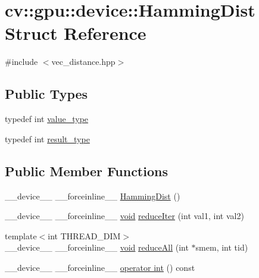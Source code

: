\hypertarget{structcv_1_1gpu_1_1device_1_1HammingDist}{\section{cv\-:\-:gpu\-:\-:device\-:\-:Hamming\-Dist Struct Reference}
\label{structcv_1_1gpu_1_1device_1_1HammingDist}
}


{\ttfamily \#include $<$vec\-\_\-distance.\-hpp$>$}

\subsection*{Public Types}
\begin{DoxyCompactItemize}
\item 
typedef int \hyperlink{structcv_1_1gpu_1_1device_1_1HammingDist_ad19a0e8b774ca3ff6a1f6b25c035906c}{value\-\_\-type}
\item 
typedef int \hyperlink{structcv_1_1gpu_1_1device_1_1HammingDist_a2312271ebed1a0962f8506f87fa0dcf7}{result\-\_\-type}
\end{DoxyCompactItemize}
\subsection*{Public Member Functions}
\begin{DoxyCompactItemize}
\item 
\-\_\-\-\_\-device\-\_\-\-\_\- \-\_\-\-\_\-forceinline\-\_\-\-\_\- \hyperlink{structcv_1_1gpu_1_1device_1_1HammingDist_a43334d45c6948b54fd88a4f843e25b8c}{Hamming\-Dist} ()
\item 
\-\_\-\-\_\-device\-\_\-\-\_\- \-\_\-\-\_\-forceinline\-\_\-\-\_\- \hyperlink{legacy_8hpp_a8bb47f092d473522721002c86c13b94e}{void} \hyperlink{structcv_1_1gpu_1_1device_1_1HammingDist_a18e25d9f4300af0073fe81966f56a751}{reduce\-Iter} (int val1, int val2)
\item 
{\footnotesize template$<$int T\-H\-R\-E\-A\-D\-\_\-\-D\-I\-M$>$ }\\\-\_\-\-\_\-device\-\_\-\-\_\- \-\_\-\-\_\-forceinline\-\_\-\-\_\- \hyperlink{legacy_8hpp_a8bb47f092d473522721002c86c13b94e}{void} \hyperlink{structcv_1_1gpu_1_1device_1_1HammingDist_a5cfbb497d5c61ee1aaf9593d1a75d7e2}{reduce\-All} (int $\ast$smem, int tid)
\item 
\-\_\-\-\_\-device\-\_\-\-\_\- \-\_\-\-\_\-forceinline\-\_\-\-\_\- \hyperlink{structcv_1_1gpu_1_1device_1_1HammingDist_af041127e56b2021567149ee43c9ac7f7}{operator int} () const 
\end{DoxyCompactItemize}
